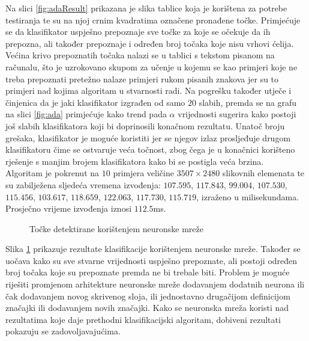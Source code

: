 \documentclass[times, utf8, zavrsni, numeric]{fer}
\begin{document}
Na slici \ref{fig:adaResult} prikazana je slika tablice koja je korištena za potrebe testiranja te su na njoj crnim kvadratima označene pronađene točke.
Primjećuje se da klasifikator uspješno prepoznaje sve točke za koje se očekuje da ih prepozna, ali također prepoznaje i određen broj točaka koje nisu vrhovi ćelija.
Većina krivo prepoznatih točaka nalazi se u tablici s tekstom pisanom na računalu, što je uzrokovano skupom za učenje u kojemu se kao primjeri koje ne treba prepoznati pretežno nalaze primjeri rukom pisanih znakova jer su to primjeri nad kojima algoritam u stvarnosti radi.
Na pogrešku također utječe i činjenica da je jaki klasifikator izgrađen od samo $20$ slabih, premda se na grafu na slici \ref{fig:ada} primjećuje kako trend pada $\alpha$ vrijednosti sugerira kako postoji još slabih klasifikatora koji bi doprinosili konačnom rezultatu.
Unatoč broju grešaka, klasifikator je moguće koristiti jer se njegov izlaz prosljeđuje drugom klasifikatoru čime se ostvaruje veća točnost, zbog čega je u konačnici korišteno rješenje s manjim brojem klasifikatora kako bi se postigla veća brzina.\\

Algoritam je pokrenut na $10$ primjera veličine $3507\times2480$ slikovnih elemenata te su zabilježena sljedeća vremena izvođenja: $107.595$, $117.843$, $99.004$, $107.530$, $115.456$, $103.617$, $118.659$, $122.063$, $117.730$, $115.719$, izraženo u milisekundama. 
Prosječno vrijeme izvođenja iznosi $112.5$ms.

\begin{figure}[!ht]
    \centering
    \captionsetup{justification=centering}
    \caption{Točke detektirane korištenjem neuronske mreže}
    \label{fig:neuralResult}
\end{figure}

Slika \ref{fig:neuralResult} prikazuje rezultate klasifikacije korištenjem neuronske mreže. 
Također se uočava kako su sve stvarne vrijednosti uspješno prepoznate, ali postoji određen broj točaka koje su prepoznate premda ne bi trebale biti. 
Problem je moguće riješiti promjenom arhitekture neuronske mreže dodavanjem dodatnih neurona ili čak dodavanjem novog skrivenog sloja, ili jednostavno drugačijom definicijom značajki ili dodavanjem novih značajki.
Kako se neuronska mreža koristi nad rezultatima koje daje prethodni klasifikacijski algoritam, dobiveni rezultati pokazuju se zadovoljavajućima.\\
\end{document}
